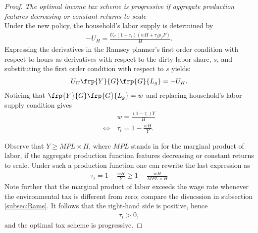 \begin{proof} \textit{The optimal income tax scheme is progressive if aggregate production features decreasing or constant returns to scale}\\
Under the new policy, the household's labor supply is determined by
\begin{align}
-U_H=\frac{U_C (1-\tau_{\iota})(wH+\tau_f p_fF)}{H}.
\end{align}
Expressing the derivatives in the Ramsey planner's first order condition with respect to hours as derivatives with respect to the dirty labor share, $s$, and substituting the first order condition with respect to $s$ yields:
\begin{align}
U_C \frp{Y}{G}\frp{G}{L_g}=-U_H.
\end{align}
Noticing that $\frp{Y}{G}\frp{G}{L_g}=w$ and replacing household's labor supply condition gives
\begin{align}
& w=\frac{(1-\tau_\iota)Y}{H}\\
\Leftrightarrow\ & \tau_\iota=1-\frac{wH}{Y}. 
\end{align} 


Observe that $Y\geq MPL \times H$, where $MPL$ stands in for the marginal product of labor, if the aggregate production function features decreasing or constant returns to scale. Under such a production function one can rewrite the last expression as
\begin{align}
\tau_{\iota}=1-\frac{wH}{Y}\geq 1-\frac{w H}{MPL \times H}
\end{align}
 Note further that the marginal product of labor exceeds the wage rate whenever the environmental tax is different from zero; compare the disucssion in subsection \ref{subsec:Rams}. It follows that the right-hand side is positive, hence
\begin{align}
\tau_{\iota}>0,
\end{align}
and the optimal tax scheme is progressive.
\end{proof}

\begin{comment}
\begin{prop}
Effect of using progressive income scheme on inequality (maybe as opposed to lump-sum transfers)
\end{prop}

content...
\end{comment}

